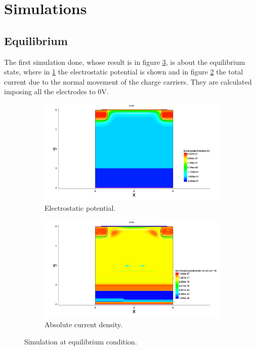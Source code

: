\documentclass[11pt,a4paper]{article}
\begin{document}
	\section{Simulations}
	\subsection{Equilibrium}
	The first simulation done, whose result is in figure \ref*{equilibrium}, is about the equilibrium state, where in \ref*{elecpotential} the electrostatic potential is shown and in figure \ref*{currents} the total current due to the normal movement of the charge carriers. They are calculated imposing all the electrodes to 0V.
		\begin{figure}
			\centering
			\begin{subfigure}[b]{0.45\textwidth}
				\centering
				\includegraphics[width=\textwidth]{electrostatic_potential11.png}
				\caption{Electrostatic potential.}
				\label{elecpotential}
			\end{subfigure}
			\hfill
			\begin{subfigure}[b]{0.45\textwidth}
				\centering
				\includegraphics[width=\textwidth]{currents.png}
				\caption{Absolute current density.}
				\label{currents}
			\end{subfigure}
			\caption{Simulation at equilibrium condition.}
			\label{equilibrium}
		\end{figure}
\end{document}
